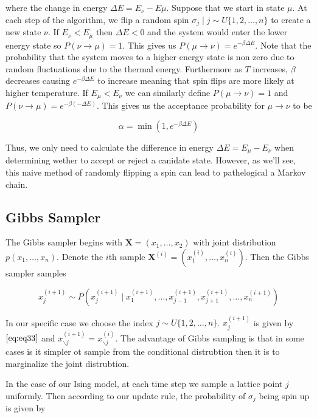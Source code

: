 \documentclass{article}
\begin{document}
where the change in energy $\Delta E = E_{\nu} - E{\mu}$. Suppose that we start in state $\mu$. At each step of the algorithm, we flip a random spin $\sigma_j \mid j \sim U\{1,2,\ldots,n\}$ to create a new state $\nu$.
If $E_{\nu} < E_{\mu}$ then $\Delta E < 0$ and the system would enter the lower energy state so $P(\nu \rightarrow \mu) = 1$. This gives us
$P(\mu \rightarrow \nu) = e^{-\beta \Delta E}$. Note that the probability that the system moves to a higher energy state 
is non zero due to random fluctuations due to the thermal energy. Furthermore as $T$ increases, $\beta$ decreases causing $e^{-\beta \Delta E}$
to increase meaning that spin flips are more likely at higher temperature. If $E_{\mu} < E_{\nu}$ we can similarly define $P(\mu \rightarrow \nu) = 1$
and $P(\nu \rightarrow \mu) = e^{-\beta(-\Delta E)}$. This gives us the acceptance probability for $\mu \rightarrow \nu$ to be

\begin{equation}
    \alpha = \min(1, e^{-\beta \Delta E})
\end{equation}

Thus, we only need to calculate the difference in energy $\Delta E = E_{\mu} - E_{\nu}$ when determining wether to accept or reject a canidate state.
However, as we'll see, this naive method of randomly flipping a spin can lead to pathelogical a Markov chain.

\subsection{Gibbs Sampler}
The Gibbs sampler begins with $\mathbf{X} = (x_1, \ldots, x_2)$ with joint distribution $p(x_1, \ldots, x_n)$. Denote the $i$th sample
$\mathbf{X}^{(i)} = (x_1^{(i)}, \ldots, x_n^{(i)})$. Then the Gibbs sampler samples

\begin{equation} \label{eq:eq33}
    x_j^{(i+1)} \sim P(x_j^{(i+1)} \mid x_1^{(i+1)}, \ldots, x_{j-1}^{(i+1)}, x_{j+1}^{(i+1)}, \ldots, x_{n}^{(i+1)})
\end{equation}

In our specific case we choose the index $j \sim U\{1,2,\ldots, n\}$. $x_j^{(i+1)}$ is given by $\ref{eq:eq33}$ and 
$x_{\backslash j}^{(i+1)} = x_{\backslash j}^{(i)}$. The advantage of Gibbs sampling is that in some cases is it simpler ot sample from the conditional
distrubtion then it is to marginalize the joint distrubtion.

In the case of our Ising model, at each time step we sample a lattice point $j$ uniformly. Then according to our update rule, 
the probability of $\sigma_j$ being spin up is given by 
\end{document}
